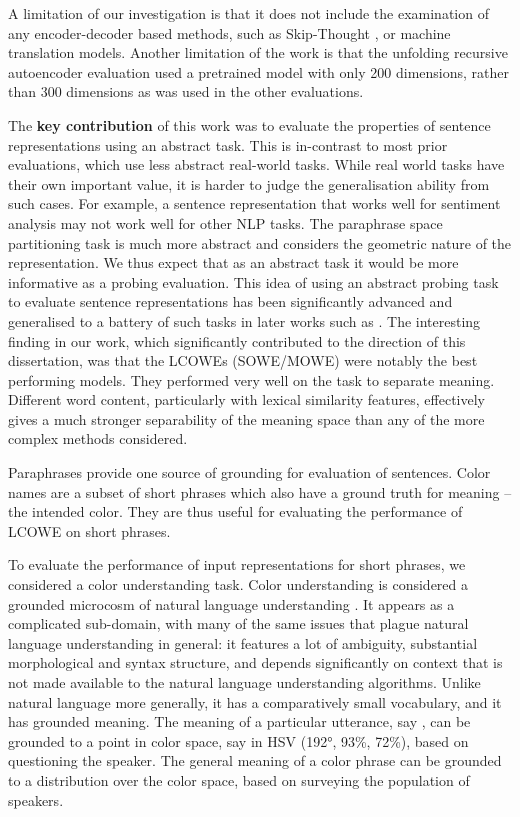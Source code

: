 \documentclass{book}
\begin{document}
A limitation of our investigation is that it does not include the examination of any encoder-decoder based methods, such as Skip-Thought \citep{DBLP:journals/corr/KirosZSZTUF15}, or machine translation models.
Another limitation of the work is that the unfolding recursive autoencoder \citep{SocherEtAl2011:PoolRAE}  evaluation used a pretrained model with only 200 dimensions, rather than 300 dimensions as was used in the other evaluations.


The \textbf{key contribution} of this work was to evaluate the properties of sentence representations using an abstract task.
This is in-contrast to most prior evaluations, which use less abstract real-world tasks.
While real world tasks have their own important value, it is harder to judge the generalisation ability from such cases.
For example, a sentence representation that works well for sentiment analysis may not work well for other NLP tasks.
The paraphrase space partitioning task is much more abstract and considers the geometric nature of the representation.
We thus expect that as an abstract task it would be more informative as a probing evaluation.
This idea of using an abstract probing task to evaluate sentence representations has been significantly advanced and generalised to a battery of such tasks in later works such as \citet{adi2017Probing,ac2018probingsentencevectors}.
The interesting finding in our work, which significantly contributed to the direction of this dissertation,
was that the LCOWEs (SOWE/MOWE) were notably the best performing models.
They performed very well on the task to separate meaning.
Different word content, particularly with lexical similarity features, effectively gives a much stronger separability of the meaning space than any of the more complex methods considered.

Paraphrases provide one source of grounding for evaluation of sentences.
Color names are a subset of short phrases which also have a ground truth for meaning -- the intended color.
They are thus useful for evaluating the performance of LCOWE on short phrases.

To evaluate the performance of input representations for short phrases, we considered a color understanding task.
Color understanding is considered a grounded microcosm of natural language understanding \citep{2016arXiv160603821M}.
It appears as a complicated sub-domain, with many of the same issues that plague natural language understanding in general:
it features a lot of ambiguity, substantial morphological and syntax structure, and depends significantly on context that is not made available to the natural language understanding algorithms.
Unlike natural language more generally, it has a comparatively small vocabulary, and it has grounded meaning.
The meaning of a particular utterance, say , can be grounded to a point in color space, say in HSV (192°, 93\%, 72\%), based on questioning the speaker.
The general meaning of a color phrase can be grounded to a distribution over the color space, based on surveying the population of speakers.
\end{document}
